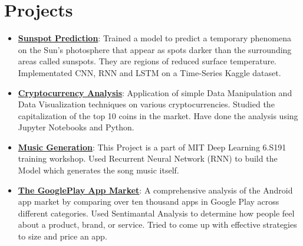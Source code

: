 \documentclass[letterpaper,11pt]{article}
\newcommand{\resumeItem}[2]{
  \item\small{
    \textbf{#1}{: #2 \vspace{-2pt}}
  }
}
\newcommand{\resumeSubItem}[2]{\resumeItem{#1}{#2}\vspace{-4pt}}
\newcommand{\resumeSubHeadingListStart}{\begin{itemize}[leftmargin=*]}
\newcommand{\resumeSubHeadingListEnd}{\end{itemize}}
\begin{document}
\section{Projects}
  \resumeSubHeadingListStart
    \resumeSubItem{\href{https://github.com/shashwatroy/Sunspot-Prediction}{Sunspot Prediction}}
      {Trained a model to predict a temporary phenomena on the Sun's photosphere that appear as spots darker than the surrounding areas called sunspots. They are regions of reduced surface temperature. Implementated CNN, RNN and LSTM on a Time-Series Kaggle dataset.}
    \resumeSubItem{\href{https://github.com/shashwatroy/Cryptocurrency-Analysis}{Cryptocurrency Analysis}}
      {Application of simple Data Manipulation and Data Visualization techniques on various cryptocurrencies. Studied the capitalization of the top 10 coins in the market. Have done the analysis using Jupyter Notebooks and Python.}
    \resumeSubItem{\href{https://github.com/shashwatroy/Music-Generation}{Music Generation}}
      {This Project is a part of MIT Deep Learning 6.S191 training workshop. Used Recurrent Neural Network (RNN) to build the Model which generates the song music itself.}
    \resumeSubItem{\href{https://github.com/shashwatroy/The-Google-Playstore}{The GooglePlay App Market}}
      {A comprehensive analysis of the Android app market by comparing over ten thousand apps in Google Play across different categories. Used Sentimantal Analysis to determine how people feel about a product, brand, or service. Tried to come up with effective strategies to size and price an app.}
  \resumeSubHeadingListEnd

%


\end{document}
